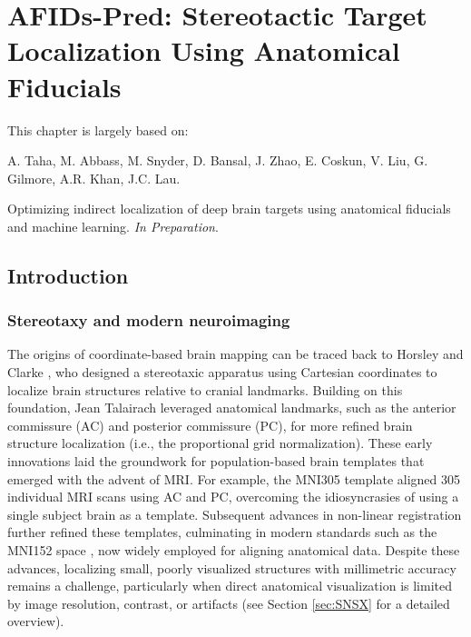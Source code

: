 \chapter{AFIDs-Pred: Stereotactic Target Localization Using Anatomical Fiducials}\label{chap:afidspred}
\newpage
\sloppy
\noindent This chapter is largely based on:
\begin{itemize}[noitemsep,topsep=0pt]
    \begin{small}
    \item
    A. Taha, M. Abbass, M. Snyder, D. Bansal, J. Zhao, E. Coskun, V. Liu, G. Gilmore, A.R. Khan, J.C. Lau.
    \end{small} Optimizing indirect localization of deep brain targets using anatomical fiducials and machine learning. \textit{In Preparation}.
\end{itemize}


\section{Introduction}

\subsection{Stereotaxy and modern neuroimaging}
The origins of coordinate-based brain mapping can be traced back to Horsley and Clarke \cite{Horsley1908-om}, who designed a stereotaxic apparatus using Cartesian coordinates to localize brain structures relative to cranial landmarks. Building on this foundation, Jean Talairach \cite{Schaltenbrand1977-ge, Talairach1957-eb} leveraged anatomical landmarks, such as the anterior commissure (AC) and posterior commissure (PC), for more refined brain structure localization (i.e., the proportional grid normalization). These early innovations laid the groundwork for population-based brain templates that emerged with the advent of MRI. For example, the MNI305 template \cite{Collins1994-dx} aligned 305 individual MRI scans using AC and PC, overcoming the idiosyncrasies of using a single subject brain as a template. Subsequent advances in non-linear registration further refined these templates, culminating in modern standards such as the MNI152 space \cite{Fonov2009-oi}, now widely employed for aligning anatomical data. Despite these advances, localizing small, poorly visualized structures with millimetric accuracy remains a challenge, particularly when direct anatomical visualization is limited by image resolution, contrast, or artifacts (see Section \ref{sec:SNSX} for a detailed overview).


